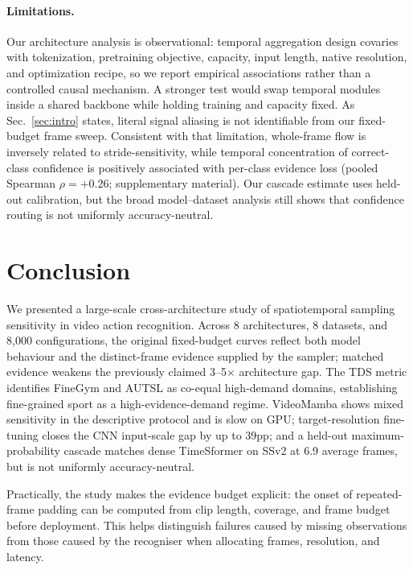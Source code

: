 \documentclass[runningheads]{llncs}
\newcommand{\TDS}{\textsc{TDS}}
\newcommand{\rev}[1]{\textcolor{revblue}{#1}}
\newcommand{\revdel}[1]{}
\begin{document}
\revdel{This also changes how one should read fixed-recipe video benchmarks. A single native-resolution, fixed-stride number can hide the fact that two models exchange rank once the temporal budget or input resolution changes. The dashboard and tables therefore expose operating points rather than only peak accuracy, making the sampling constraint explicit.}

\paragraph{Limitations.}
Our architecture analysis is observational: temporal aggregation design covaries with tokenization, pretraining objective, capacity, input length, native resolution, and optimization recipe, so we report empirical associations rather than a controlled causal mechanism. A stronger test would swap temporal modules inside a shared backbone while holding training and capacity fixed. \rev{As Sec.~\ref{sec:intro} states, literal signal aliasing is not identifiable from our fixed-budget frame sweep. Consistent with that limitation,} whole-frame flow is inversely related to stride-sensitivity, while temporal concentration of correct-class confidence is positively associated with per-class \rev{evidence loss} (pooled Spearman $\rho=+0.26$; supplementary material). \revdel{Routing thresholds trace validation Pareto frontiers and should be calibrated on a held-out split before deployment.} \rev{Our cascade estimate uses held-out calibration, but the broad model--dataset analysis still shows that confidence routing is not uniformly accuracy-neutral.}

\section{Conclusion}
\label{sec:conclusion}

We presented a large-scale cross-architecture study of \rev{spatiotemporal sampling sensitivity} in video action recognition. Across 8 architectures, 8 datasets, and 8,000 configurations, \rev{the original fixed-budget curves reflect both model behaviour and the distinct-frame evidence supplied by the sampler; matched evidence weakens the previously claimed 3--5$\times$ architecture gap.} The \TDS{} metric identifies FineGym and AUTSL as co-equal high-demand domains, establishing fine-grained sport as a high-\rev{evidence-demand} regime. VideoMamba shows \rev{mixed sensitivity in the descriptive protocol} and is slow on GPU; target-resolution fine-tuning closes the CNN input-scale gap by up to 39pp; and a \rev{held-out maximum-probability cascade matches dense TimeSformer on SSv2 at 6.9 average frames, but is not uniformly accuracy-neutral.}

\rev{Practically, the study makes the evidence budget explicit: the onset of repeated-frame padding can be computed from clip length, coverage, and frame budget before deployment. This helps distinguish failures caused by missing observations from those caused by the recogniser when allocating frames, resolution, and latency.}



\end{document}
